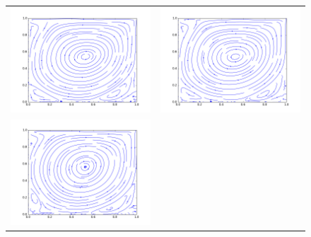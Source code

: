\begin{figure}
	\centering
	\begin{tabulary}{\linewidth}{c c}
		\includegraphics[width=\figwid]{figs/lid/power_bgk_100_n1.5_Re10000/sl_step-000050000}
		&
		\includegraphics[width=\figwid]{figs/lid/power_svec_100_n1.5_Re10000/sl_step-000050000}
		\\
		\includegraphics[width=\figwid]{figs/lid/power_bgk-filter_100_n1.5_Re10000/sl_step-000050000}

\end{tabulary}
\end{figure}
